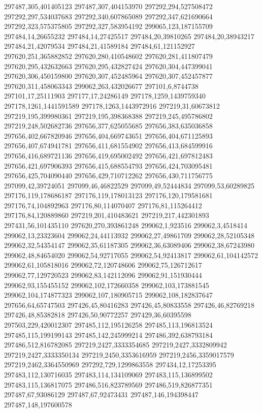 297487,305,401405123
297487,307,404153970
297292,294,527508472
297292,297,534037683
297292,340,607865089
297292,347,621690664
297292,323,575375805
297292,327,583954192
299065,123,187155709
297484,14,26655232
297484,14,27425517
297484,20,39810265
297484,20,38943217
297484,21,42079534
297484,21,41589184
297484,61,121152927
297620,251,365882852
297620,280,410548602
297620,281,411807479
297620,295,432632663
297620,295,432827424
297620,304,447399041
297620,306,450159800
297620,307,452485964
297620,307,452457877
297620,311,458063343
299062,263,432026677
297101,6,8744738
297101,17,25111903
297177,17,24286149
297178,1259,1439759340
297178,1261,1441591589
297178,1263,1443972916
297219,31,60673812
297219,195,399980361
297219,195,398368388
297219,245,495786802
297219,248,502682736
297656,377,625055685
297656,383,635036858
297656,402,667820946
297656,404,669743651
297656,404,671125893
297656,407,674941781
297656,411,681554902
297656,413,684599916
297656,416,689721136
297656,419,695002492
297656,421,697812483
297656,421,697906393
297656,415,688554793
297656,424,703095481
297656,425,704090440
297656,429,710712262
297656,430,711756775
297099,42,39724051
297099,46,46822529
297099,49,52444834
297099,53,60289825
297176,119,178686187
297176,119,178013123
297176,120,179581681
297176,74,104892963
297176,80,114070407
297176,81,115264412
297176,84,120889860
297219,201,410483621
297219,217,442301893
297431,56,101435110
297620,270,393861248
299062,1,923516
299062,3,4518414
299062,13,23323604
299062,24,44113932
299062,27,49861709
299062,28,52105348
299062,32,54354147
299062,35,61187305
299062,36,63089406
299062,38,67243980
299062,48,84654020
299062,54,92717055
299062,54,92413817
299062,61,104142572
299062,61,105818016
299062,72,120748606
299062,75,126712617
299062,77,129720523
299062,83,142112096
299062,91,151930444
299062,93,155455152
299062,102,172660358
299062,103,173881545
299062,104,174877323
299062,107,180905715
299062,108,182837647
297656,64,65747503
297426,45,80416283
297426,45,80833558
297426,46,82769218
297426,48,85382818
297426,50,90772257
297429,36,60395598
297503,229,420012307
297485,112,195126258
297485,113,196813524
297485,115,199199143
297485,142,245999214
297486,392,638793184
297486,512,816782085
297219,2427,3333354685
297219,2427,3332809942
297219,2427,3333350134
297219,2450,3353616959
297219,2456,3359017579
297219,2462,3364550969
297292,729,1299863558
297434,12,17253395
297483,112,130716035
297483,114,134109069
297483,115,136899502
297483,115,136817075
297486,516,823789569
297486,519,826877351
297487,67,93086129
297487,67,92473431
297487,146,194398447
297487,148,197600578
